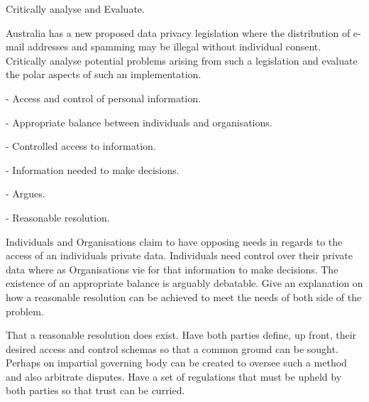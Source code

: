 


Critically analyse and Evaluate.


Australia has a new proposed data privacy legislation where the distribution of e-mail addresses and spamming may be illegal without individual consent. Critically analyse potential problems arising from such a legislation and evaluate the polar aspects of such an implementation.



\item - Access and control of personal information.
\item - Appropriate balance between individuals and organisations.
\item - Controlled access to information.
\item - Information needed to make decisions.


\item - Argues.
\item - Reasonable resolution.


Individuals and Organisations claim to have opposing needs in regards to the access of an individuals private data. Individuals need control over their private data where as Organisations vie for that information to make decisions. The existence of an appropriate balance is arguably debatable. Give an explanation on how a reasonable resolution can be achieved to meet the needs of both side of the problem.


That a reasonable resolution does exist. Have both parties define, up front, their desired access and control schemas so that a common ground can be sought. Perhaps on impartial governing body can be created to oversee such a method and also arbitrate disputes. Have a set of regulations that must be upheld by both parties so that trust can be curried.

